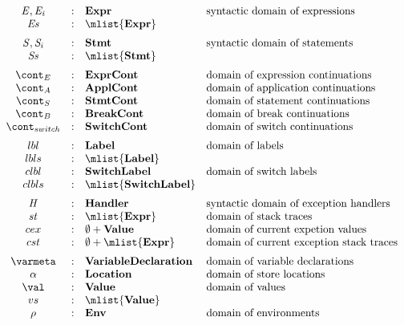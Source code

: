 \documentclass{article}
\begin{document}
\newcommand{\dclass}{\mathbf{Class}}
\newcommand{\dformals}{\mathbf{Formals}}
\[
  \begin{array}{ccll}
	\expr, \expri{i}
	& : & \dexpr & \textrm{syntactic domain of expressions}\\
	\exprs
	& : & \mlist{\dexpr}\\[2mm]

	\stmt, \stmti{i}
	& : & \dstmt & \textrm{syntactic domain of statements}\\
	\stmts
	& : & \mlist{\dstmt}  & \textrm{}\\[2mm]

	\econt
	& : & \decont & \textrm{domain of expression continuations}\\
	\acont
	& : & \dacont & \textrm{domain of application continuations}\\
	\scont
	& : & \dscont & \textrm{domain of statement continuations}\\
	\bcont
	& : & \dbcont & \textrm{domain of break continuations}\\
	\switchcont
	& : & \dswitchcont & \textrm{domain of switch continuations}\\[2mm]

	\lbl & : & \dlbl & \textrm{domain of labels}\\
	\lbls & : & \mlist{\dlbl} \\
	\clbl & : & \dclbl & \textrm{domain of switch labels}\\
	\clbls & : & \mlist{\dclbl} \\[2mm]

	\handler
	& : & \dhandler & \textrm{syntactic domain of exception handlers} \\
	\strace
	& : & \mlist{\dexpr} & \textrm{domain of stack traces}\\
	\cex
	& : &  \emptyset + \dval & \textrm{domain of current expetion values}\\
	\cstrace
	& : & \emptyset + \mlist{\dexpr} & \textrm{domain of current exception stack traces}\\[2mm]

	\varmeta
	& : & \dvardecl & \textrm{domain of variable declarations}\\
	\loc
	& : & \dlocation & \textrm{domain of store locations}\\
	\val
	& : & \dval & \textrm{domain of values}\\
	\vals
	& : & \mlist{\dval}\\
	\env
	& : & \denv & \textrm{domain of environments}\\[2mm]
  \end{array}
\]
\end{document}
